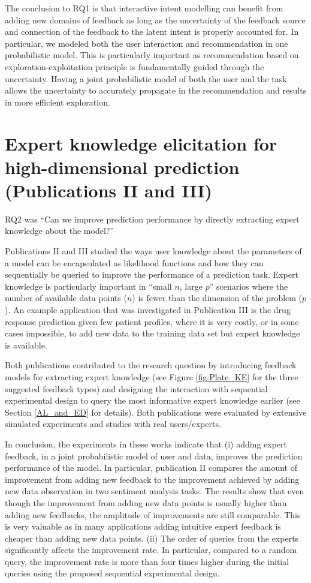 \documentclass[dissertation,math,vertlayout,pdfa,colorlinks]{aaltoseries}
\begin{document}
The conclusion to RQ1 is that interactive intent modelling can benefit from adding new domains of feedback as long as the uncertainty of the feedback source and connection of the feedback to the latent intent is properly accounted for. In particular, we modeled both the user interaction and recommendation in one probabilistic model. This is particularly important as recommendation based on exploration-exploitation principle is fundamentally guided through the uncertainty. Having a joint probabilistic model of both the user and the task allows the uncertainty to accurately propagate in the recommendation and results in more efficient exploration. 


\section{Expert knowledge elicitation for high-dimensional prediction (Publications II and III)}

RQ2 was ``Can we improve prediction performance by directly extracting expert knowledge about the model?''

Publications II and III studied the ways user knowledge about the parameters of a model can be encapsulated as likelihood functions and how they can sequentially be queried to improve the performance of a prediction task. Expert knowledge is particularly important in ``small $n$, large $p$'' scenarios where the number of available data points ($n$) is fewer than the dimension of the problem ($p$). An example application that was investigated in Publication III is the drug response prediction given few patient profiles, where it is very costly, or in some cases impossible, to add new data to the training data set but expert knowledge is available. 

Both publications contributed to the research question by introducing feedback models for extracting expert knowledge (see Figure \ref{fig:Plate_KE} for the three suggested feedback types) and designing the interaction with sequential experimental design to query the most informative expert knowledge earlier (see Section \ref{AL_and_ED} for details). Both publications were evaluated by extensive simulated experiments and studies with real users/experts.

In conclusion, the experiments in these works indicate that (i) adding expert feedback, in a joint probabilistic model of user and data, improves the prediction performance of the model. In particular, publication II compares the amount of improvement from adding new feedback to the improvement achieved by adding new data observation in two sentiment analysis tasks. The results show that even though the improvement from adding new data points is usually higher than adding new feedbacks, the amplitude of improvements are still comparable. This is very valuable as in many applications adding intuitive expert feedback is cheaper than adding new data points. (ii) The order of queries from the experts significantly affects the improvement rate. In particular, compared to a random query, the improvement rate is more than four times higher during the initial queries using the proposed sequential experimental design.
\end{document}
